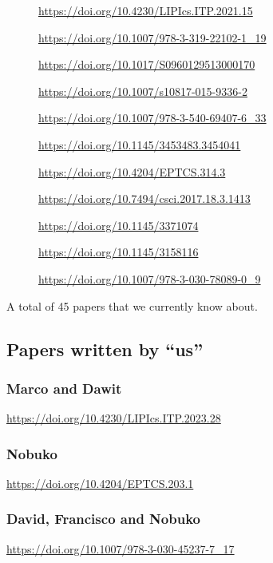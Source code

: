 \begin{description}
\item[\cite{Cruz-Filipe2021b}]            \url{https://doi.org/10.4230/LIPIcs.ITP.2021.15}
\item[\cite{Maksimovic2015}]              \url{https://doi.org/10.1007/978-3-319-22102-1_19}
\item[\cite{Parrow2014}]                  \url{https://doi.org/10.1017/S0960129513000170}
\item[\cite{Bengtson2016}]                \url{https://doi.org/10.1007/s10817-015-9336-2}
\item[\cite{Kahsai2008}]                  \url{https://doi.org/10.1007/978-3-540-69407-6_33}
\item[\cite{Castro-Perez2021}]            \url{https://doi.org/10.1145/3453483.3454041}
\item[\cite{Gay2020}]                     \url{https://doi.org/10.4204/EPTCS.314.3}
\item[\cite{Brady2017}]                   \url{https://doi.org/10.7494/csci.2017.18.3.1413}
\item[\cite{Hinrichsen2019}]              \url{https://doi.org/10.1145/3371074}
\item[\cite{Sergey2017}]                  \url{https://doi.org/10.1145/3158116}
\item[\cite{DBLP:conf/forte/ZalakainD21}] \url{https://doi.org/10.1007/978-3-030-78089-0_9}
\end{description}

A total of 45 papers that we currently know about.

\subsection{Papers written by ``us''}
\subsubsection{Marco and Dawit}
\cite{Tirore:2023} \url{https://doi.org/10.4230/LIPIcs.ITP.2023.28}

\subsubsection{Nobuko}
\cite{Orchard2016} \url{https://doi.org/10.4204/EPTCS.203.1}

\subsubsection{David, Francisco and Nobuko}
\cite{Castro2020} \url{https://doi.org/10.1007/978-3-030-45237-7_17}


